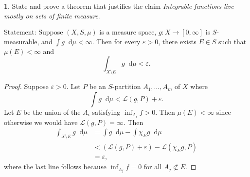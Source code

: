 \documentclass[12pt]{article}
\newcommand{\dd}{\mathop{}\!\mathrm{d}}
\theoremstyle{definition}
\newtheorem{ex}{}
\newenvironment{exercise}[1]{
	\renewcommand{\theex}{#1}
	\begin{ex}
		}{\end{ex}}
\begin{document}
\begin{exercise}{2(c)}
	State and prove a theorem that justifies the claim \textit{Integrable functions live mostly on sets of finite measure}.
\end{exercise}
Statement: Suppose $(X, S, \mu)$ is a measure space, $g : X \to [0, \infty]$ is $S$-measurable, and $\int g \dd \mu < \infty$.
Then for every $\varepsilon > 0$, there exists $E \in S$ such that $\mu(E) < \infty$ and \begin{equation*}
	\int_{X \setminus E} g \dd \mu < \varepsilon.
\end{equation*}
\begin{proof}
	Suppose $\varepsilon > 0$.
	Let $P$ be an $S$-partition $A_1, \dots, A_m$ of $X$ where \begin{equation*}
		\int g \dd\mu < \mathcal{L}(g, P) + \varepsilon.
	\end{equation*}
	Let $E$ be the union of the $A_i$ satisfying $\inf_{A_i} f > 0$.
	Then $\mu(E) < \infty$ since otherwise we would have $\mathcal{L}(g, P) = \infty$.
	Then \begin{align*}
		\int_{X \setminus E} g \dd\mu & = \int g \dd\mu - \int \chi_E g \dd \mu                       \\
		                              & < (\mathcal{L}(g, P) + \varepsilon) - \mathcal{L}(\chi_Eg, P) \\
		                              & = \varepsilon,
	\end{align*}
	where the last line follows because $\inf_{A_j} f = 0 $ for all $A_j \not\subset E$.
\end{proof}
\end{document}
